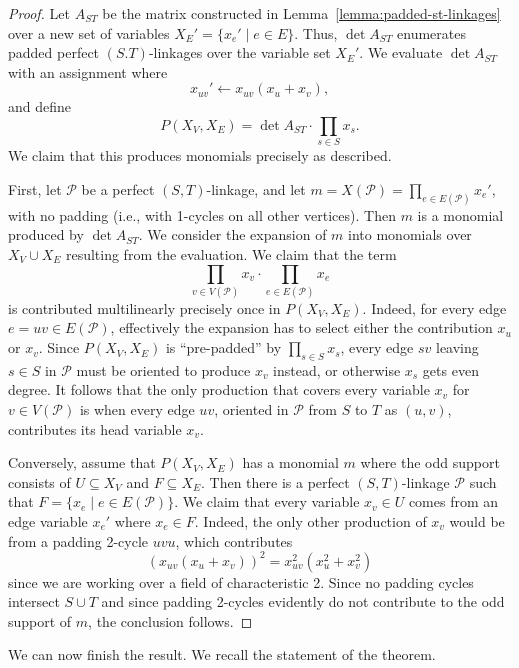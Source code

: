 \documentclass[10pt,a4paper]{article}
\newcommand{\cP}{\ensuremath{\mathcal P}\xspace}
\begin{document}
\begin{proof}
  Let $A_{ST}$ be the matrix constructed in Lemma~\ref{lemma:padded-st-linkages}
  over a new set of variables $X_E'=\{x_e' \mid e \in E\}$.
  Thus, $\det A_{ST}$ enumerates padded perfect $(S.T)$-linkages
  over the variable set $X_E'$. We evaluate $\det A_{ST}$ with an
  assignment where
  \[
    x_{uv}' \gets x_{uv}(x_u+x_v),
  \]
  and define
  \[
    P(X_V,X_E) = \det A_{ST} \cdot \prod_{s \in S} x_s.
  \]
  We claim that this produces monomials precisely as described. 

  First, let $\cP$ be a perfect $(S,T)$-linkage, and let
  $m=X(\cP)=\prod_{e \in E(\cP)} x_e'$, with no padding (i.e., with
  1-cycles on all other vertices). Then $m$ is a monomial produced by
  $\det A_{ST}$. We consider the expansion of $m$ into monomials 
  over $X_V \cup X_E$ resulting from the evaluation.
  We claim that the term
  \[
    \prod_{v \in V(\cP)} x_v \cdot \prod_{e \in E(\cP)} x_e
  \]
  is contributed multilinearly precisely once in $P(X_V,X_E)$. 
  Indeed, for every edge $e=uv \in E(\cP)$, effectively the expansion
  has to select either the contribution $x_u$ or $x_v$. Since 
  $P(X_V,X_E)$ is ``pre-padded'' by $\prod_{s \in S} x_s$, 
  every edge $sv$ leaving $s \in S$ in $\cP$ must be oriented to
  produce $x_v$ instead, or otherwise $x_s$ gets even degree. 
  It follows that the only production that covers every variable
  $x_v$ for $v \in V(\cP)$ is when every edge $uv$, oriented in $\cP$
  from $S$ to $T$ as $(u,v)$, contributes its head variable $x_v$. 
  
  Conversely, assume that $P(X_V,X_E)$ has a monomial $m$ where the
  odd support consists of $U \subseteq X_V$ and $F \subseteq X_E$.
  Then there is a perfect $(S,T)$-linkage $\cP$ such that
  $F=\{x_e \mid e \in E(\cP)\}$. We claim that every variable
  $x_v \in U$ comes from an edge variable $x_e'$ where $x_e \in F$.
  Indeed, the only other production of $x_v$ would be from a padding
  2-cycle $uvu$, which contributes
  \[
    (x_{uv}(x_u+x_v))^2 = x_{uv}^2(x_u^2+x_v^2)
  \]
  since we are working over a field of characteristic 2. Since no
  padding cycles intersect $S \cup T$ and since padding 2-cycles
  evidently do not contribute to the odd support of $m$,
  the conclusion follows. 
\end{proof}

We can now finish the result. We recall the statement of the theorem.

\linkageframework*
\end{document}
